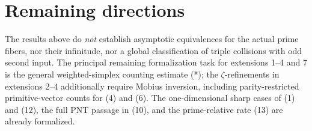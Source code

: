 \documentclass[10pt,a4paper]{scrartcl}
\begin{document}
\section{Remaining directions}

The results above do \emph{not} establish asymptotic equivalences for the actual prime fibers, nor their infinitude, nor a global classification of triple collisions with odd second input. The principal remaining formalization task for extensions 1--4 and 7 is the general weighted-simplex counting estimate (*); the $\zeta$-refinements in extensions 2--4 additionally require Mobius inversion, including parity-restricted primitive-vector counts for (4) and (6). The one-dimensional sharp cases of (1) and (12), the full PNT passage in (10), and the prime-relative rate (13) are already formalized.
\end{document}
